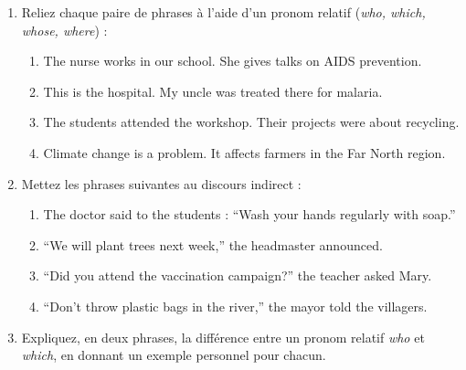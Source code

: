 \documentclass[11pt]{article}
\begin{document}
\begin{exercice}
\begin{enumerate}
\item Reliez chaque paire de phrases à l'aide d'un pronom relatif (\textit{who, which, whose, where}) :
\begin{enumerate}
\item The nurse works in our school. She gives talks on AIDS prevention.
\item This is the hospital. My uncle was treated there for malaria.
\item The students attended the workshop. Their projects were about recycling.
\item Climate change is a problem. It affects farmers in the Far North region.
\end{enumerate}
\item Mettez les phrases suivantes au discours indirect :
\begin{enumerate}
\item The doctor said to the students : ``Wash your hands regularly with soap.''
\item ``We will plant trees next week,'' the headmaster announced.
\item ``Did you attend the vaccination campaign?'' the teacher asked Mary.
\item ``Don't throw plastic bags in the river,'' the mayor told the villagers.
\end{enumerate}
\item Expliquez, en deux phrases, la différence entre un pronom relatif \textit{who} et \textit{which}, en donnant un exemple personnel pour chacun.
\end{enumerate}
\end{exercice}
\end{document}
